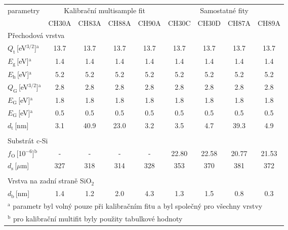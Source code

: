 \begin{tabular}{lcccccccc}
\hline
parametry & \multicolumn{4}{c}{Kalibrační multisample fit} & \multicolumn{4}{c}{Samostatné fity}\\
 & CH30A & CH83A & CH88A & CH90A & CH30C & CH30D & CH87A & CH89A\\
\hline
\multicolumn{9}{l}{Přechodová vrstva}\\
\hline
$Q_\mathrm{t}$\,[eV$^{3/2}$]$^\mathrm{a}$ & 13.7 & 13.7 & 13.7 & 13.7 & 13.7 & 13.7 & 13.7 & 13.7\\
$E_\mathrm{g}$\,[eV]$^\mathrm{a}$ & 1.4 & 1.4 & 1.4 & 1.4 & 1.4 & 1.4 & 1.4 & 1.4\\
$E_\mathrm{h}$\,[eV]$^\mathrm{a}$ & 5.2 & 5.2 & 5.2 & 5.2 & 5.2 & 5.2 & 5.2 & 5.2\\
$Q_\mathrm{G}$\,[eV$^{3/2}$]$^\mathrm{a}$ & 2.8 & 2.8 & 2.8 & 2.8 & 2.8 & 2.8 & 2.8 & 2.8\\
$E_\mathrm{G}$\,[eV]$^\mathrm{a}$ & 1.8 & 1.8 & 1.8 & 1.8 & 1.8 & 1.8 & 1.8 & 1.8\\
$E_\mathrm{G}$\,[eV]$^\mathrm{a}$ & 0.5 & 0.5 & 0.5 & 0.5 & 0.5 & 0.5 & 0.5 & 0.5\\
$d_\mathrm{t}$\,[nm] & 3.1 & 40.9 & 23.0 & 3.2 & 3.5 & 4.7 & 39.3 & 4.9\\
\multicolumn{9}{l}{}\\
\multicolumn{9}{l}{Substrát c-Si}\\
\hline
$f_\mathrm{O}$\,[10$^{-6}$]$^\mathrm{b}$ & - & - & - & - & 22.80 & 22.58 & 20.77 & 21.53\\
$d_\mathrm{s}$\,[$\mu$m] & 327 & 318 & 314 & 328 & 353 & 370 & 381 & 372\\
\multicolumn{9}{l}{}\\
\multicolumn{9}{l}{Vrstva na zadní straně SiO$_2$}\\
\hline
$d_\mathrm{b}$\,[nm] & 1.4 & 1.2 & 2.0 & 4.3 & 1.3 & 1.5 & 0.8 & 0.3\\

\hline
\multicolumn{9}{l}{$^\mathrm{a}$ parametr byl volný pouze při kalibračním fitu a byl společný pro všechny vrstvy}\\
\multicolumn{9}{l}{$^\mathrm{b}$ pro kalibrační multifit byly použity tabulkové hodnoty}\\
\end{tabular}
